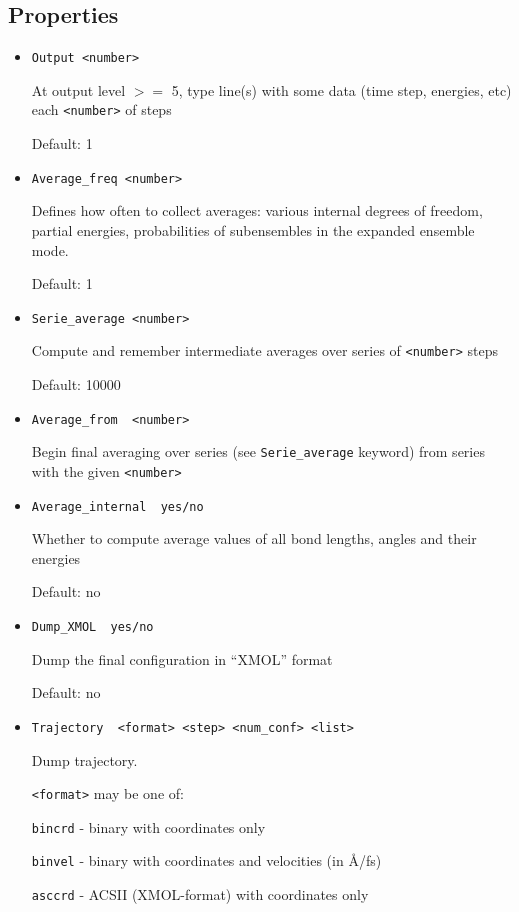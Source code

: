 \documentclass{article}
\begin{document}
\subsection{Properties}

\begin{itemize}

\item
\verb|Output <number>|

At output level $>=$ 5, type line(s) with some data (time step, energies, etc)
each \verb|<number>| of steps

Default: 1 

\item
\verb|Average_freq <number>|

Defines how often to collect averages: various internal degrees of freedom,
partial energies, probabilities of subensembles in the expanded ensemble mode.

Default: 1 

\item
\verb|Serie_average <number>|

Compute and remember intermediate averages over series of \verb|<number>| steps

Default:  10000

\item
\verb|Average_from  <number>|

Begin final averaging over series (see \verb|Serie_average| keyword) from 
series with the given \verb|<number>|

\item
\verb|Average_internal  yes/no|

Whether to compute average values of all bond lengths, angles and their
energies

Default: no


\item
\verb|Dump_XMOL  yes/no|

Dump the final configuration in ``XMOL'' format

Default: no

\item
\verb|Trajectory  <format> <step> <num_conf> <list>|

Dump trajectory. 

\verb|<format>| may be one of:

\verb|bincrd|  - binary with coordinates only

\verb|binvel|  - binary with coordinates and velocities (in \AA/fs)

\verb|asccrd|  - ACSII (XMOL-format) with coordinates only    


\end{itemize}
\end{document}

